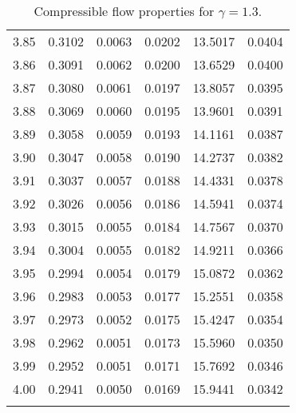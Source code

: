 \documentclass{article}
\begin{document}
\begin{longtable}{cccccc}
3.85 & 0.3102 & 0.0063 & 0.0202 & 13.5017 & 0.0404 \\
3.86 & 0.3091 & 0.0062 & 0.0200 & 13.6529 & 0.0400 \\
3.87 & 0.3080 & 0.0061 & 0.0197 & 13.8057 & 0.0395 \\
3.88 & 0.3069 & 0.0060 & 0.0195 & 13.9601 & 0.0391 \\
3.89 & 0.3058 & 0.0059 & 0.0193 & 14.1161 & 0.0387 \\
3.90 & 0.3047 & 0.0058 & 0.0190 & 14.2737 & 0.0382 \\
3.91 & 0.3037 & 0.0057 & 0.0188 & 14.4331 & 0.0378 \\
3.92 & 0.3026 & 0.0056 & 0.0186 & 14.5941 & 0.0374 \\
3.93 & 0.3015 & 0.0055 & 0.0184 & 14.7567 & 0.0370 \\
3.94 & 0.3004 & 0.0055 & 0.0182 & 14.9211 & 0.0366 \\
3.95 & 0.2994 & 0.0054 & 0.0179 & 15.0872 & 0.0362 \\
3.96 & 0.2983 & 0.0053 & 0.0177 & 15.2551 & 0.0358 \\
3.97 & 0.2973 & 0.0052 & 0.0175 & 15.4247 & 0.0354 \\
3.98 & 0.2962 & 0.0051 & 0.0173 & 15.5960 & 0.0350 \\
3.99 & 0.2952 & 0.0051 & 0.0171 & 15.7692 & 0.0346 \\
4.00 & 0.2941 & 0.0050 & 0.0169 & 15.9441 & 0.0342 \\
\bottomrule
\caption{Compressible flow properties for $\gamma = 1.3$.}
\end{longtable}
\end{document}
